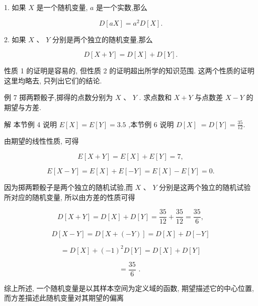 \documentclass[10pt]{article}
\begin{document}
1. 如果 \(X\) 是一个随机变量, \(a\) 是一个实数,那么

\[
D\left\lbrack  {aX}\right\rbrack   = {a}^{2}D\left\lbrack  X\right\rbrack  .
\]

2. 如果 \(X\text{ 、 }Y\) 分别是两个独立的随机变量,那么

\[
D\left\lbrack  {X + Y}\right\rbrack   = D\left\lbrack  X\right\rbrack   + D\left\lbrack  Y\right\rbrack  .
\]

性质 1 的证明是容易的, 但性质 2 的证明超出所学的知识范围. 这两个性质的证明这里均略去, 只列出它们的结论.

例 7 掷两颗骰子,掷得的点数分别为 \(X\text{ 、 }Y\) . 求点数和 \(X + Y\) 与点数差 \(X - Y\) 的期望与方差.

解 本节例 4 说明 \(E\left\lbrack  X\right\rbrack   = E\left\lbrack  Y\right\rbrack   = {3.5}\) ,本节例 6 说明 \(D\left\lbrack  X\right\rbrack \; = D\left\lbrack  Y\right\rbrack   = \frac{35}{12}.\)

由期望的线性性质, 可得

\[
E\left\lbrack  {X + Y}\right\rbrack   = E\left\lbrack  X\right\rbrack   + E\left\lbrack  Y\right\rbrack   = 7,
\]

\[
E\left\lbrack  {X - Y}\right\rbrack   = E\left\lbrack  X\right\rbrack   + E\left\lbrack  {-Y}\right\rbrack   = E\left\lbrack  X\right\rbrack   - E\left\lbrack  Y\right\rbrack   = 0.
\]

因为掷两颗骰子是两个独立的随机试验,而 \(X\text{ 、 }Y\) 分别是这两个独立的随机试验所对应的随机变量, 所以由方差的性质可得

\[
D\left\lbrack  {X + Y}\right\rbrack   = D\left\lbrack  X\right\rbrack   + D\left\lbrack  Y\right\rbrack   = \frac{35}{12} + \frac{35}{12} = \frac{35}{6},
\]

\[
D\left\lbrack  {X - Y}\right\rbrack   = D\left\lbrack  {X + \left( {-Y}\right) }\right\rbrack   = D\left\lbrack  X\right\rbrack   + D\left\lbrack  {-Y}\right\rbrack
\]

\[
= D\left\lbrack  X\right\rbrack   + {\left( -1\right) }^{2}D\left\lbrack  Y\right\rbrack   = D\left\lbrack  X\right\rbrack   + D\left\lbrack  Y\right\rbrack
\]

\[
= \frac{35}{6}\text{ . }
\]

综上所述, 一个随机变量是以其样本空间为定义域的函数, 期望描述它的中心位置, 而方差描述此随机变量对其期望的偏离

\section*{}
\end{document}
